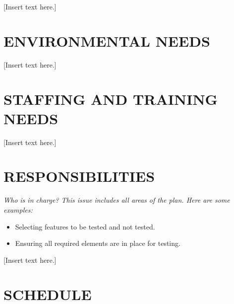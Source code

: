 \documentclass[twoside,letterpaper]{article}
\begin{document}
[Insert text here.]

\section[ENVIRONMENTAL NEEDS]{\bfseries ENVIRONMENTAL NEEDS}

[Insert text here.]


\section[STAFFING AND TRAINING NEEDS]
{\bfseries STAFFING AND TRAINING NEEDS}

[Insert text here.]


\section[RESPONSIBILITIES]{\bfseries RESPONSIBILITIES}
{\itshape
Who is in charge?
This issue includes all areas of the plan. Here are some examples:
\begin{itemize}
\item Selecting features to be tested and not tested.
\item Ensuring all required elements are in place for testing. 
\end{itemize} }

[Insert text here.]


\section[SCHEDULE]{\bfseries SCHEDULE}

\end{document}
